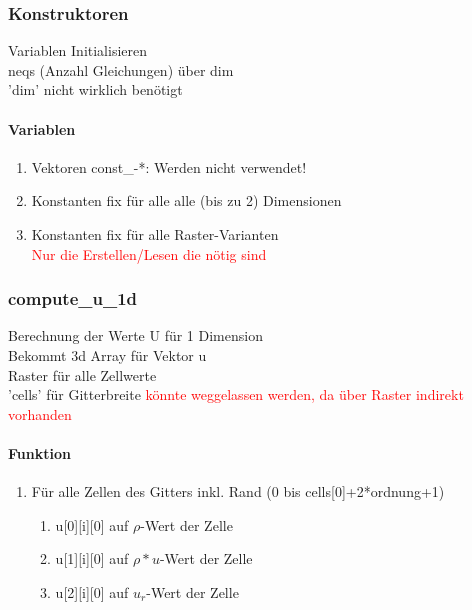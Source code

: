 \documentclass[12pt]{article}
\begin{document}
\subsubsection{Konstruktoren}
Variablen Initialisieren\\
neqs (Anzahl Gleichungen) über dim\\
'dim' nicht wirklich benötigt

\renewcommand{\labelenumi}{\alph{enumi})} 
\paragraph{Variablen}
\begin{enumerate}
	\item Vektoren const\_-*: Werden nicht verwendet!
	\item Konstanten fix für alle alle (bis zu 2) Dimensionen
	\item Konstanten fix für alle Raster-Varianten\\
	\textcolor{red}{Nur die Erstellen/Lesen die nötig sind}
\end{enumerate}

\subsubsection{compute\_u\_1d}
Berechnung der Werte U für 1 Dimension\\
Bekommt 3d Array für Vektor u\\
Raster für alle Zellwerte\\
'cells' für Gitterbreite \textcolor{red}{könnte weggelassen werden, da über Raster indirekt vorhanden}\\

\renewcommand{\labelenumi}{\alph{enumi})} 
\paragraph{Funktion}
\begin{enumerate}
	\item Für alle Zellen des Gitters inkl. Rand (0 bis cells[0]+2*ordnung+1)
	\begin{enumerate}
		\item u[0][i][0] auf $\rho$-Wert der Zelle
		\item u[1][i][0] auf $\rho * u$-Wert der Zelle
		\item u[2][i][0] auf $u_r$-Wert der Zelle
	\end{enumerate}
\end{enumerate}
\end{document}
